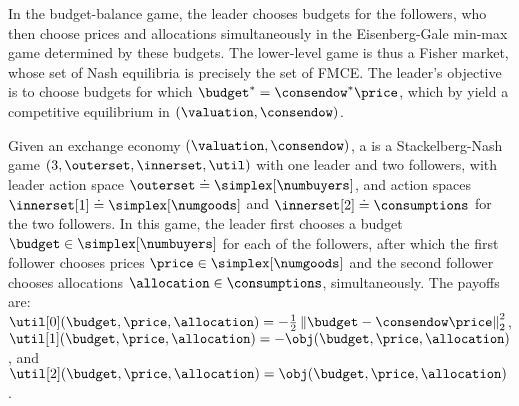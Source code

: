 In the budget-balance game, the leader chooses budgets for the followers, who then choose prices and allocations simultaneously  in the Eisenberg-Gale min-max game determined by these budgets.
The lower-level game is thus a Fisher market, whose set of Nash equilibria is precisely the set of FMCE.
The leader's objective is to choose budgets for which $\budget^* = \consendow^* \price$, which by  yield a competitive equilibrium in $(\valuation, \consendow)$. 


\begin{definition}\label{def:budget_balance}
Given an exchange economy $(\valuation, \consendow)$, a  is a Stackelberg-Nash game $(3, \outerset, \innerset, \util)$ with one leader and two followers, with leader action space $\outerset \doteq \simplex[\numbuyers]$, and action spaces $\innerset[1] \doteq \simplex[\numgoods]$ and $\innerset[2] \doteq \consumptions$ for the two followers. 
In this game, the leader first chooses a budget $\budget \in \simplex[\numbuyers]$ for each of the followers, after which the first follower chooses prices $\price \in \simplex[\numgoods]$ and the second follower chooses allocations $\allocation \in \consumptions$, simultaneously.
The payoffs are:
$\util[0](\budget, \price, \allocation) = -\frac{1}{2}\left\| \budget - \consendow \price\right\|_2^2$,
$\util[1](\budget, \price, \allocation) = - \obj (\budget, \price, \allocation)$, and 
$\util[2](\budget, \price, \allocation) = \obj (\budget, \price, \allocation)$.
\end{definition}


